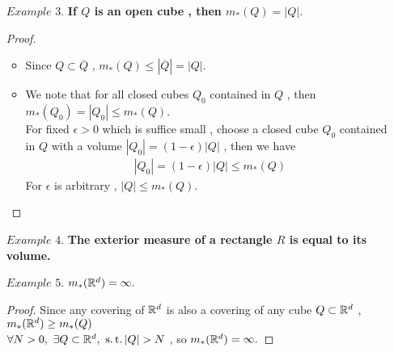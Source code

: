 \begin{enumerate}
		\item[$Example \,\, 3 .$]\textbf{If $Q$ is an open cube , then $m_{*}(Q) = \left| Q \right|.$}
		\begin{proof}
			\begin{itemize}
				\item Since $Q \subset \overline{Q}$ , $m_{*}(Q) \leq \left| \overline{Q} \right| = \left| Q \right|$.
				
				\item We note that for all closed cubes $Q_0$ contained in $Q$ , then $m_{*}(Q_0) = \left| Q_0 \right| \leq m_{*}(Q)$.\\
				For fixed $\epsilon > 0$ which is suffice small , choose a closed cube $Q_0$ contained in $Q$ with a volume $\left| Q_0 \right| = (1 - \epsilon)\left| Q \right|$ , then we have
				\begin{align}
					\left| Q_0 \right| = (1 - \epsilon)\left| Q \right| \leq m_{*}(Q)
				\end{align}
				For $\epsilon$ is arbitrary , $\left| Q \right| \leq m_{*}(Q)$.
			\end{itemize}
		\end{proof}
	
		\item[$Example \,\, 4 .$]\textbf{The exterior measure of a rectangle $R$ is equal to its volume.}
		
		\item[$Example \,\, 5 .$]\textbf{$m_{*}(\mathbb{R}^d) = \infty.$}
		\begin{proof}
			Since any covering of $\mathbb{R}^d$ is also a covering of any cube $Q \subset \mathbb{R}^d$ , $m_{*}(\mathbb{R}^d) \geq m_{*}(Q)$\\
			$\forall N > 0 , \,\, \exists Q \subset \mathbb{R}^d , \,\, \operatorname{s.t.} \left| Q \right| > N$ , so $m_{*}(\mathbb{R}^d) = \infty.$
		\end{proof}
	\end{enumerate}

\vspace*{3em}
